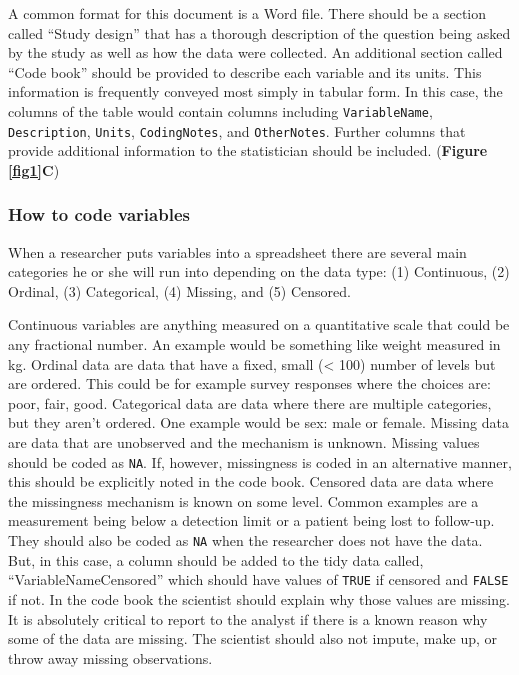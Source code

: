 \documentclass[12pt]{article}
\begin{document}
A common format for this document is a Word file. There should be a
section called ``Study design'' that has a thorough description of the
question being asked by the study as well as how the data were
collected. An additional section called ``Code book'' should be provided
to describe each variable and its units. This information is frequently
conveyed most simply in tabular form. In this case, the columns of the
table would contain columns including \texttt{VariableName},
\texttt{Description}, \texttt{Units}, \texttt{CodingNotes}, and
\texttt{OtherNotes}. Further columns that provide additional information
to the statistician should be included. (\textbf{Figure \ref{fig1}C})

\subsubsection{How to code variables}\label{how-to-code-variables}

When a researcher puts variables into a spreadsheet there are several
main categories he or she will run into depending on the data type: (1)
Continuous, (2) Ordinal, (3) Categorical, (4) Missing, and (5) Censored.

Continuous variables are anything measured on a quantitative scale that
could be any fractional number. An example would be something like
weight measured in kg. Ordinal data are data that have a fixed, small
(\textless{} 100) number of levels but are ordered. This could be for
example survey responses where the choices are: poor, fair, good.
Categorical data are data where there are multiple categories, but they
aren't ordered. One example would be sex: male or female. Missing data
are data that are unobserved and the mechanism is unknown. Missing
values should be coded as \texttt{NA}. If, however, missingness is coded
in an alternative manner, this should be explicitly noted in the code
book. Censored data are data where the missingness mechanism is known on
some level. Common examples are a measurement being below a detection
limit or a patient being lost to follow-up. They should also be coded as
\texttt{NA} when the researcher does not have the data. But, in this
case, a column should be added to the tidy data called,
``VariableNameCensored'' which should have values of \texttt{TRUE} if
censored and \texttt{FALSE} if not. In the code book the scientist
should explain why those values are missing. It is absolutely critical
to report to the analyst if there is a known reason why some of the data
are missing. The scientist should also not impute, make up, or throw
away missing observations.
\end{document}
